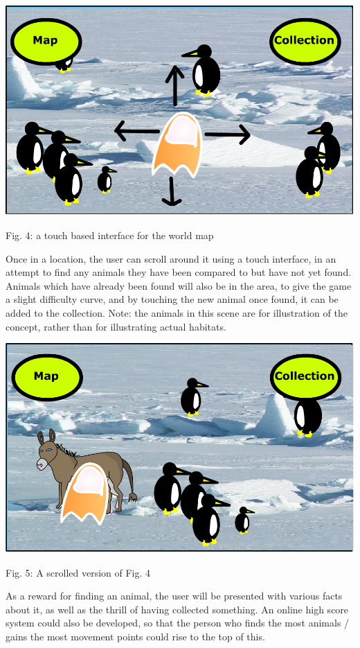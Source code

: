 \documentclass[]{article}
\begin{document}
\begin{center}
\includegraphics[scale=0.22]{zone1.png}

Fig. 4: a touch based interface for the world map
\end{center}

Once in a location, the user can scroll around it using a touch interface, in an attempt to find any animals they have been compared to but have not yet found. Animals which have already been found will also be in the area, to give the game a slight difficulty curve, and by touching the new animal once found, it can be added to the collection. Note: the animals in this scene are for illustration of the concept, rather than for illustrating actual habitats.

\begin{center}
\includegraphics[scale=0.22]{zone2.png}

Fig. 5: A scrolled version of Fig. 4
\end{center}

As a reward for finding an animal, the user will be presented with various facts about it, as well as the thrill of having collected something. An online high score system could also be developed, so that the person who finds the most animals / gains the most movement points could rise to the top of this.
\end{document}
